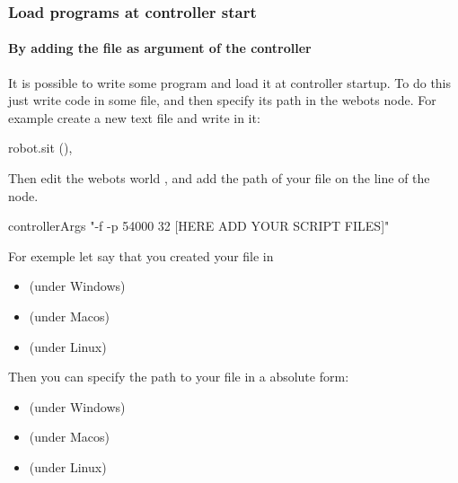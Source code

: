 \subsubsection{Load \urbi programs at controller start}
\label{webots.firstrun.loadprograms}%

\paragraph{By adding the file as argument of the \urbi controller}
\label{webots.firstrun.loadprograms.cmd_line}%

It is possible to write some \us program and load it at controller
startup.  To do this just write \us code in some file, and then
specify its path in the  webots node.  For
example create a new text file  and write in it:

\begin{urbifixme}
robot.sit (),
\end{urbifixme}

Then edit the webots world , and
add the path of your file  on the line of the
 node.


\begin{shell}
controllerArgs "-f -p 54000 32 [HERE ADD YOUR SCRIPT FILES]"
\end{shell}

For exemple let say that you created your file in
\begin{itemize}
\item {}
  (under Windows)
\item {}
  (under Macos)
\item {}
  (under Linux)
\end{itemize}

Then you can specify the path to your file in a absolute form:
\begin{itemize}
\item {}
  (under Windows)
\item {}
  (under Macos)
\item {}
  (under Linux)
\end{itemize}

